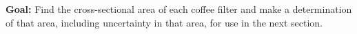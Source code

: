 
\textbf{Goal:} Find the cross-sectional area of each coffee filter and make a determination of that area, including uncertainty in that area, for use in the next section.
 


